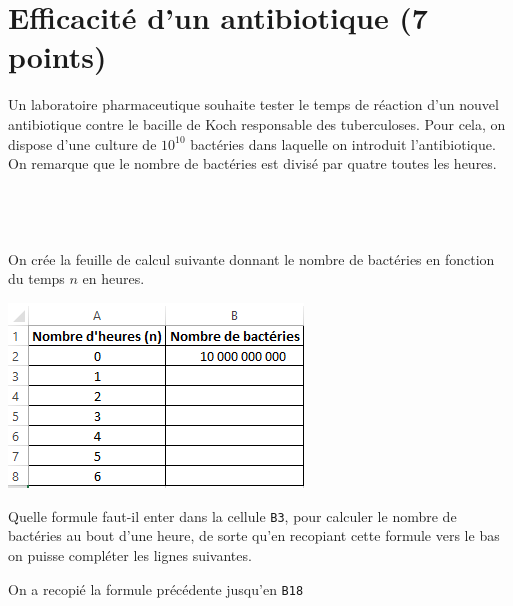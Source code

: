 
\section{Efficacité d'un antibiotique (7 points)}

Un laboratoire pharmaceutique souhaite tester le temps de réaction d'un nouvel antibiotique contre le bacille de Koch responsable des tuberculoses. Pour cela, on dispose d'une culture de $10^{10}$ bactéries dans laquelle on introduit l'antibiotique. On remarque que le nombre de bactéries est divisé par quatre toutes les heures.

\subsection{\ }

On crée la feuille de calcul suivante donnant le nombre de bactéries en fonction du temps $n$ en heures.

\begin{center}
	\includegraphics[scale=1]{img/bacteries}
\end{center}

\begin{questions}
	\question[1] Quelle formule faut-il enter dans la cellule \texttt{B3}, pour calculer le nombre de bactéries au bout d'une heure, de sorte qu'en recopiant cette formule vers le bas on puisse compléter les lignes suivantes.
	
	
	\question[1]  On a recopié la formule précédente jusqu'en \texttt{B18} 
	
	
\end{questions}

